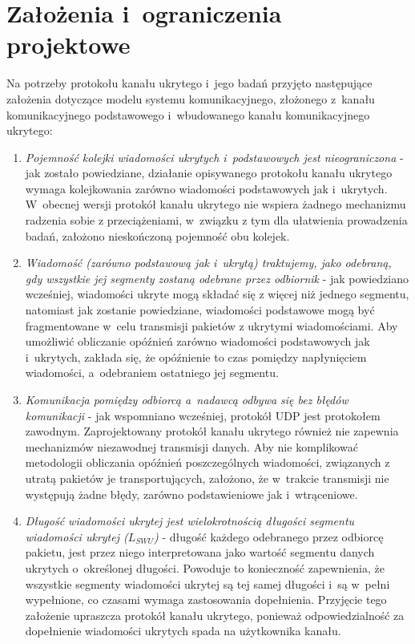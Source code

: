 \documentclass[a4paper, twoside, 12pt]{report}
\begin{document}
    \section{Założenia i~ograniczenia projektowe}
    Na potrzeby protokołu kanału ukrytego i~jego badań przyjęto następujące założenia
    dotyczące modelu systemu komunikacyjnego, złożonego z~kanału komunikacyjnego
    podstawowego i~wbudowanego kanału komunikacyjnego ukrytego:
    \begin{enumerate}
        \item \emph{Pojemność kolejki wiadomości ukrytych i~podstawowych jest nieograniczona} -
            jak zostało powiedziane, działanie opisywanego protokołu
            kanału ukrytego wymaga kolejkowania zarówno wiadomości podstawowych
            jak i~ukrytych. W~obecnej wersji protokół kanału ukrytego nie wspiera
            żadnego mechanizmu radzenia sobie z przeciążeniami, w~związku z tym
            dla ułatwienia prowadzenia badań, założono nieskończoną pojemność obu kolejek.

        \item \emph{Wiadomość (zarówno podstawową jak i~ukrytą) traktujemy, jako odebraną,
            gdy wszystkie jej segmenty zostaną odebrane przez odbiornik} - jak powiedziano
            wcześniej, wiadomości ukryte mogą składać się z więcej niż jednego segmentu,
            natomiast jak zostanie powiedziane, wiadomości podstawowe mogą być fragmentowane
            w~celu transmisji pakietów z ukrytymi wiadomościami. Aby umożliwić
            obliczanie opóźnień zarówno wiadomości podstawowych jak i~ukrytych,
            zakłada się, że opóźnienie to czas pomiędzy napłynięciem wiadomości,
            a~odebraniem ostatniego jej segmentu.

        \item \emph{Komunikacja pomiędzy odbiorcą a~nadawcą odbywa się bez błędów komunikacji} -
            jak wspomniano wcześniej, protokół UDP jest protokołem zawodnym.
            Zaprojektowany protokół kanału ukrytego również nie zapewnia mechanizmów niezawodnej
            transmisji danych. Aby nie komplikować metodologii
            obliczania opóźnień poszczególnych wiadomości, związanych z utratą
            pakietów je transportujących, założono, że w~trakcie transmisji nie
            występują żadne błędy, zarówno podstawieniowe jak i~wtrąceniowe.

        \item \emph{Długość wiadomości ukrytej jest wielokrotnością długości segmentu
            wiadomości ukrytej (\(L_{SWU}\))} - długość każdego odebranego przez odbiorcę pakietu,
            jest przez niego interpretowana jako wartość segmentu danych ukrytych o~określonej
            długości. Powoduje to konieczność zapewnienia, że wszystkie segmenty
            wiadomości ukrytej są tej samej długości i~są w~pełni wypełnione, co czasami
            wymaga zastosowania dopełnienia. Przyjęcie tego założenie upraszcza protokół
            kanału ukrytego, ponieważ odpowiedzialność za dopełnienie wiadomości ukrytych
            spada na użytkownika kanału.
    \end{enumerate}
\end{document}
